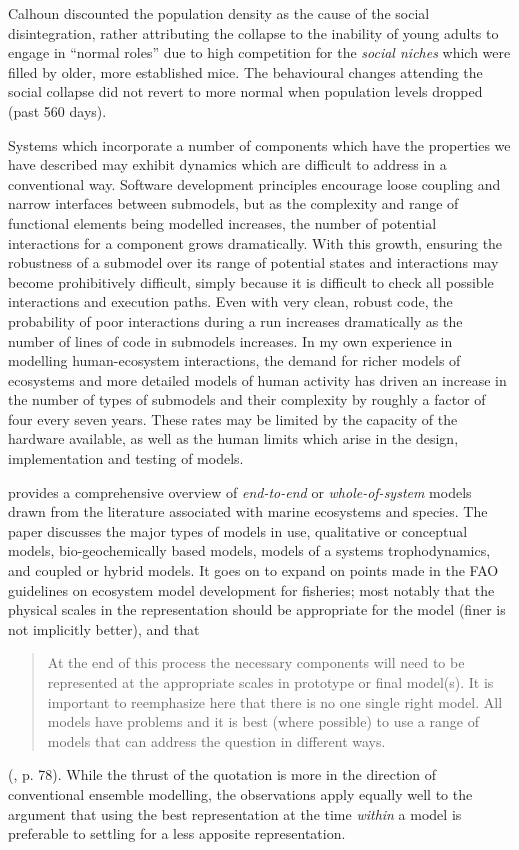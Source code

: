 Calhoun discounted the population density as the cause of the social
disintegration, rather attributing the collapse to the inability of
young adults to engage in ``normal roles'' due to high competition for
the \emph{social niches} which were filled by older, more established
mice. The behavioural changes attending the social collapse did not revert
to more normal when population levels dropped (past 560 days).

Systems which incorporate a number of components which have the
properties we have described may exhibit dynamics which are difficult
to address in a conventional way. Software development principles
encourage loose coupling and narrow interfaces between submodels, but
as the complexity and range of functional elements being modelled
increases, the number of potential interactions for a component grows
dramatically.  With this growth, ensuring the robustness of a submodel
over its range of potential states and interactions may become
prohibitively difficult, simply because it is difficult to check all
possible interactions and execution paths.  Even with very clean,
robust code, the probability of poor interactions during a run
increases dramatically as the number of lines of code in submodels
increases. In my own experience in modelling human-ecosystem
interactions, the demand for richer models of ecosystems and more
detailed models of human activity has driven an increase in the number
of types of submodels and their complexity by roughly a factor of four
every seven years. These rates may be limited by the
capacity of the hardware available, as well as the human limits which
arise in the design, implementation and testing of models.

\Cite{fulton2010approaches} provides a comprehensive overview
of \emph{end-to-end} or \emph{whole-of-system} models drawn from the
literature associated with marine ecosystems and species. 
The paper discusses the major types of models in use, qualitative or
conceptual models, bio-geochemically based models, models of a systems
trophodynamics, and coupled or hybrid models. It goes on to expand on
points made in the FAO guidelines on ecosystem model development for
fisheries; most notably that the physical scales in the representation
should be appropriate for the model (finer is not implicitly better), and
that
\begin{quote}
    At the end of this process the necessary components will need to
    be represented at the appropriate scales in prototype or final
    model(s). It is important to reemphasize here that there is no one
    single right model. All models have problems and it is best (where
    possible) to use a range of models that can address the question
    in different ways.
\end{quote} (\cite{FAO2008ecosystems}, p. 78).
While the thrust of the quotation is more in the direction of
conventional ensemble modelling, the observations apply equally well
to the argument that using the best representation at the
time \emph{within} a model is preferable to settling for a less
apposite representation.

